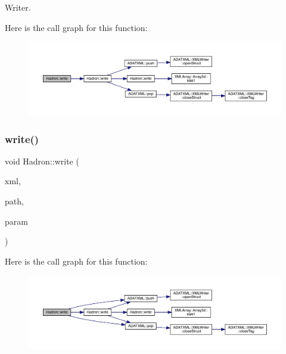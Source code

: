 Writer. 

Here is the call graph for this function\+:\nopagebreak
\begin{figure}[H]
\begin{center}
\leavevmode
\includegraphics[width=350pt]{d1/daf/namespaceHadron_a7b503b82bc88cdec19d5b7173957b35e_cgraph}
\end{center}
\end{figure}
\mbox{\label{namespaceHadron_a835e4515b6f5e491ce57ac5169196d90}} 
\subsubsection{\texorpdfstring{write()}{write()}\hspace{0.1cm}{\footnotesize\ttfamily [57/95]}}
{\footnotesize\ttfamily void Hadron\+::write (\begin{DoxyParamCaption}\item[{\mbox{\hyperlink{classADATXML_1_1XMLWriter}{X\+M\+L\+Writer}} \&}]{xml,  }\item[{const std\+::string \&}]{path,  }\item[{const \mbox{\hyperlink{structHadron_1_1KeyHadronSUNNPartIrrepOp__t_1_1CGPair__t}{Key\+Hadron\+S\+U\+N\+N\+Part\+Irrep\+Op\+\_\+t\+::\+C\+G\+Pair\+\_\+t}} \&}]{param }\end{DoxyParamCaption})}

Here is the call graph for this function\+:\nopagebreak
\begin{figure}[H]
\begin{center}
\leavevmode
\includegraphics[width=350pt]{d1/daf/namespaceHadron_a835e4515b6f5e491ce57ac5169196d90_cgraph}
\end{center}
\end{figure}
\mbox{\label{namespaceHadron_ad194604b0eb61ca7e7ffa89d1ef4c879}} 

